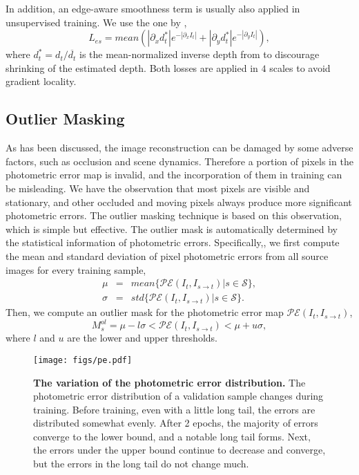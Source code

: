 \documentclass[letterpaper, 10 pt, conference]{ieeeconf}
\begin{document}
In addition, an edge-aware smoothness term is usually also applied in unsupervised training.  We use the one by \cite{godard2019digging},
\begin{equation}
L_{es} = mean\left( \left | \partial_x d^*_t   \right | e^{-\left | \partial_x I_t \right |} + \left | \partial_y d^*_t   \right | e^{-\left | \partial_y I_t \right |} \right), 
\label{eq:smooth}
\end{equation} 
where $d^*_t = d_t / \overline{d_t}$ is the mean-normalized inverse depth from \cite{wang2018learning} to discourage shrinking of the estimated depth. Both losses are applied in $4$ scales to avoid gradient locality. 


\subsection{Outlier Masking}
As has been discussed, the image reconstruction can be damaged by some adverse factors, such as occlusion and scene dynamics. Therefore a portion of pixels in the photometric error map is invalid, and the incorporation of them in training can be misleading. 
We have the observation that most pixels are visible and stationary, and other occluded and moving pixels always produce more significant photometric errors. 
The outlier masking technique is based on this observation, which is simple but effective. The outlier mask is automatically determined by the statistical information of photometric errors. 
Specifically,, we first compute the mean and standard deviation of pixel photometric errors from all source images for every training sample, 
\begin{eqnarray}
\mu &=& mean{ \{\mathcal{PE}(I_t, I_{s \to t}) | s \in \mathcal{S}\}}, \label{eq:pemean}\\
\sigma &=& std{ \{\mathcal{PE}(I_t, I_{s \to t}) | s \in \mathcal{S}\}}. \label{eq:std}
\end{eqnarray}
Then, we compute an outlier mask for the photometric error map $\mathcal{PE}(I_t, I_{s \to t})$, 
\begin{equation}
M_s^{ol} =  \mu - l\sigma<\mathcal{PE}(I_t, I_{s \to t}) < \mu + u\sigma, 
\label{eq:Mol}
\end{equation} 
where $l$ and $u$ are the lower and upper thresholds. 

\begin{figure}[t]
\vspace{6pt}
\begin{center}
\texttt{[image: figs/pe.pdf]}
\end{center}
\vspace{-6pt}
\caption{\textbf{The variation of the photometric error distribution.} The photometric error distribution of a validation sample changes during training.  Before training, even with a little long tail, the errors are distributed somewhat evenly. After 2 epochs, the majority of errors converge to the lower bound, and a notable long tail forms. Next, the errors under the upper bound continue to decrease and converge, but the errors in the long tail do not change much. }
\label{fig:pe}
 \vspace{-8pt}
\end{figure}
\end{document}
